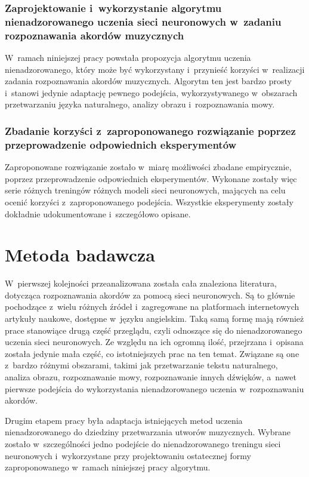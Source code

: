 \subsubsection{Zaprojektowanie i~wykorzystanie algorytmu nienadzorowanego uczenia sieci neuronowych w~zadaniu rozpoznawania akordów muzycznych}

W~ramach niniejszej pracy powstała propozycja algorytmu uczenia nienadzorowanego, który może być wykorzystany i~przynieść korzyści w~realizacji zadania rozpoznawania akordów muzycznych. Algorytm ten jest bardzo prosty i~stanowi jedynie adaptację pewnego podejścia, wykorzystywanego w~obszarach przetwarzaniu języka naturalnego, analizy obrazu i~rozpoznawania mowy.

\subsubsection{Zbadanie korzyści z~zaproponowanego rozwiązanie poprzez przeprowadzenie odpowiednich eksperymentów}

Zaproponowane rozwiązanie zostało w~miarę możliwości zbadane empirycznie, poprzez przeprowadzenie odpowiednich eksperymentów. Wykonane zostały więc serie różnych treningów różnych modeli sieci neuronowych, mających na celu ocenić korzyści z~zaproponowanego podejścia. Wszystkie eksperymenty zostały dokładnie udokumentowane i~szczegółowo opisane.



\section{Metoda badawcza}

W~pierwszej kolejności przeanalizowana została cała znaleziona literatura, dotycząca rozpoznawania akordów za pomocą sieci neuronowych. Są to głównie pochodzące z~wielu różnych źródeł i~zagregowane na platformach internetowych artykuły naukowe, dostępne w~języku angielskim. Taką samą formę mają również prace stanowiące drugą część przeglądu, czyli odnoszące się do nienadzorowanego uczenia sieci neuronowych. Ze względu na ich ogromną ilość, przejrzana i~opisana została jedynie mała część, co istotniejszych prac na ten temat. Związane są one z~bardzo różnymi obszarami, takimi jak przetwarzanie tekstu naturalnego, analiza obrazu, rozpoznawanie mowy, rozpoznawanie innych dźwięków, a~nawet pierwsze podejścia do wykorzystania nienadzorowanego uczenia w~rozpoznawaniu akordów.

Drugim etapem pracy była adaptacja istniejących metod uczenia nienadzorowanego do dziedziny przetwarzania utworów muzycznych. Wybrane zostało w~szczególności jedno podejście do nienadzorowanego treningu sieci neuronowych i~wykorzystane przy projektowaniu ostatecznej formy zaproponowanego w~ramach niniejszej pracy algorytmu.

